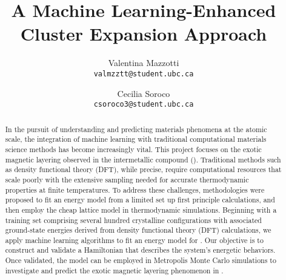 \documentclass{article}
\title{A Machine Learning-Enhanced Cluster Expansion Approach}
\author{%
  Valentina Mazzotti\\
  \texttt{valmzztt@student.ubc.ca}\\
  \and
  Cecilia Soroco\\
  \texttt{csoroco3@student.ubc.ca}
}
\begin{document}
\maketitle


\begin{abstract}
In the pursuit of understanding and predicting materials phenomena at the atomic scale, the integration of machine learning with traditional computational materials science methods has become increasingly vital. This project focuses on the exotic magnetic layering observed in the intermetallic compound  (\cite{MnNiAs}). Traditional methods such as density functional theory (DFT), while precise, require computational resources that scale poorly with the extensive sampling needed for accurate thermodynamic properties at finite temperatures. To address these challenges, methodologies were proposed to fit an energy model from a limited set up first principle calculations, and then employ the cheap lattice model in thermodynamic simulations. 
Beginning with a training set comprising several hundred crystalline configurations with associated ground-state energies derived from density functional theory (DFT) calculations, we apply machine learning algorithms to fit an energy model for . Our objective is to construct and validate a Hamiltonian that describes the system's energetic behaviors. Once validated, the model can be employed in Metropolis Monte Carlo simulations to investigate and predict the exotic magnetic layering phenomenon in . 
\end{abstract}
\end{document}
